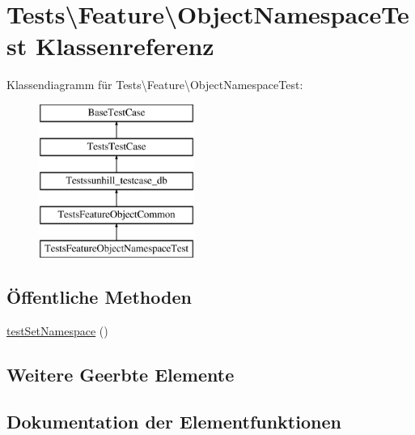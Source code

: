 \hypertarget{classTests_1_1Feature_1_1ObjectNamespaceTest}{}\section{Tests\textbackslash{}Feature\textbackslash{}Object\+Namespace\+Test Klassenreferenz}
\label{classTests_1_1Feature_1_1ObjectNamespaceTest}
Klassendiagramm für Tests\textbackslash{}Feature\textbackslash{}Object\+Namespace\+Test\+:\begin{figure}[H]
\begin{center}
\leavevmode
\includegraphics[height=5.000000cm]{d4/df2/classTests_1_1Feature_1_1ObjectNamespaceTest}
\end{center}
\end{figure}
\subsection*{Öffentliche Methoden}
\begin{DoxyCompactItemize}
\item 
\hyperlink{classTests_1_1Feature_1_1ObjectNamespaceTest_aee9884f95b95a3ea86cddc619122229b}{test\+Set\+Namespace} ()
\end{DoxyCompactItemize}
\subsection*{Weitere Geerbte Elemente}


\subsection{Dokumentation der Elementfunktionen}
\mbox{\label{classTests_1_1Feature_1_1ObjectNamespaceTest_aee9884f95b95a3ea86cddc619122229b}} 
